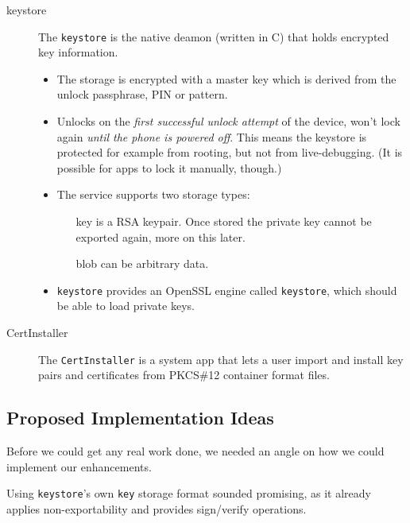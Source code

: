 \documentclass[a4paper,draft]{scrartcl}
\begin{document}
\begin{description}
			\pagebreak[3]
			\item[keystore] The \texttt{keystore} is the native deamon (written in C) that holds encrypted key information.
				\begin{itemize}
					\item The storage is encrypted with a master key which is derived from the unlock passphrase, PIN or pattern.
					\item Unlocks on the \emph{first successful unlock attempt} of the device, won't lock again \emph{until the phone is powered off}. This means the keystore is protected for example from rooting, but not from live-debugging. (It is possible for apps to lock it manually, though.)
					\item The service supports two storage types:
					\begin{itemize}
						\item[key] is a RSA keypair. Once stored the private key cannot be exported again, more on this later.
						\item[blob] can be arbitrary data.
					\end{itemize}
					\item \texttt{keystore} provides an OpenSSL engine called \texttt{keystore}, which should be able to load private keys. %
				\end{itemize}
			\item [CertInstaller] The \texttt{CertInstaller} is a system app that lets a user import and install key pairs and certificates from PKCS\#12 container format files. %
		\end{description}






	\subsection{Proposed Implementation Ideas}
		Before we could get any real work done, we needed an angle on how we could implement our enhancements.

		Using \texttt{keystore}'s own \texttt{key} storage format sounded promising, as it already applies non-exportability and provides sign/verify operations.
\end{document}
